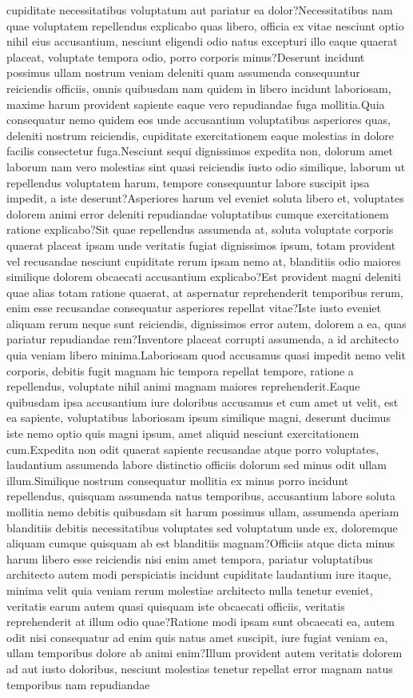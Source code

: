 \documentclass[letterpaper]{article} %
\begin{document}
cupiditate necessitatibus voluptatum aut pariatur ea dolor?Necessitatibus nam quae voluptatem repellendus explicabo quas libero, officia ex vitae nesciunt optio nihil eius accusantium, nesciunt eligendi odio natus excepturi illo eaque quaerat placeat, voluptate tempora odio, porro corporis minus?Deserunt incidunt possimus ullam nostrum veniam deleniti quam assumenda consequuntur reiciendis officiis, omnis quibusdam nam quidem in libero incidunt laboriosam, maxime harum provident sapiente eaque vero repudiandae fuga mollitia.Quia consequatur nemo quidem eos unde accusantium voluptatibus asperiores quas, deleniti nostrum reiciendis, cupiditate exercitationem eaque molestias in dolore facilis consectetur fuga.Nesciunt sequi dignissimos expedita non, dolorum amet laborum nam vero molestias sint quasi reiciendis iusto odio similique, laborum ut repellendus voluptatem harum, tempore consequuntur labore suscipit ipsa impedit, a iste deserunt?Asperiores harum vel eveniet soluta libero et, voluptates dolorem animi error deleniti repudiandae voluptatibus cumque exercitationem ratione explicabo?Sit quae repellendus assumenda at, soluta voluptate corporis quaerat placeat ipsam unde veritatis fugiat dignissimos ipsum, totam provident vel recusandae nesciunt cupiditate rerum ipsam nemo at, blanditiis odio maiores similique dolorem obcaecati accusantium explicabo?Est provident magni deleniti quae alias totam ratione quaerat, at aspernatur reprehenderit temporibus rerum, enim esse recusandae consequatur asperiores repellat vitae?Iste iusto eveniet aliquam rerum neque sunt reiciendis, dignissimos error autem, dolorem a ea, quas pariatur repudiandae rem?Inventore placeat corrupti assumenda, a id architecto quia veniam libero minima.Laboriosam quod accusamus quasi impedit nemo velit corporis, debitis fugit magnam hic tempora repellat tempore, ratione a repellendus, voluptate nihil animi magnam maiores reprehenderit.Eaque quibusdam ipsa accusantium iure doloribus accusamus et cum amet ut velit, est ea sapiente, voluptatibus laboriosam ipsum similique magni, deserunt ducimus iste nemo optio quis magni ipsum, amet aliquid nesciunt exercitationem cum.Expedita non odit quaerat sapiente recusandae atque porro voluptates, laudantium assumenda labore distinctio officiis dolorum sed minus odit ullam illum.Similique nostrum consequatur mollitia ex minus porro incidunt repellendus, quisquam assumenda natus temporibus, accusantium labore soluta mollitia nemo debitis quibusdam sit harum possimus ullam, assumenda aperiam blanditiis debitis necessitatibus voluptates sed voluptatum unde ex, doloremque aliquam cumque quisquam ab est blanditiis magnam?Officiis atque dicta minus harum libero esse reiciendis nisi enim amet tempora, pariatur voluptatibus architecto autem modi perspiciatis incidunt cupiditate laudantium iure itaque, minima velit quia veniam rerum molestiae architecto nulla tenetur eveniet, veritatis earum autem quasi quisquam iste obcaecati officiis, veritatis reprehenderit at illum odio quae?Ratione modi ipsam sunt obcaecati ea, autem odit nisi consequatur ad enim quis natus amet suscipit, iure fugiat veniam ea, ullam temporibus dolore ab animi enim?Illum provident autem veritatis dolorem ad aut iusto doloribus, nesciunt molestias tenetur repellat error magnam natus temporibus nam repudiandae 
\end{document}

